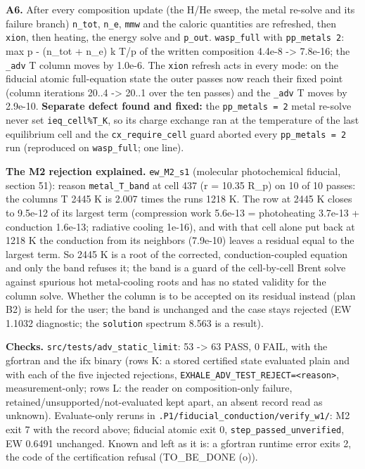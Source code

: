 \documentclass[english,a4paper]{my_memo}
\begin{document}
\textbf{A6.} After every composition update (the H/He sweep, the metal re-solve
and its failure branch) \texttt{n\_tot}, \texttt{n\_e}, \texttt{mmw} and the caloric quantities are
refreshed, then \texttt{xion}, then heating, the energy solve and \texttt{p\_out}.
\texttt{wasp\_full} with \texttt{pp\_metals\ 2}: max \textbar p - (n\_tot + n\_e) k T\textbar/p of the written
composition 4.4e-8 -\textgreater{} 7.8e-16; the \texttt{\_adv} T column moves by 1.0e-6. The
\texttt{xion} refresh acts in every mode: on the fiducial atomic full-equation
state the outer passes now reach their fixed point (column iterations
20..4 -\textgreater{} 20..1 over the ten passes) and the \texttt{\_adv} T moves by 2.9e-10.
\textbf{Separate defect found and fixed:} the \texttt{pp\_metals\ =\ 2} metal re-solve
never set \texttt{ieq\_cell\%T\_K}, so its charge exchange ran at the temperature of
the last equilibrium cell and the \texttt{cx\_require\_cell} guard aborted every
\texttt{pp\_metals\ =\ 2} run (reproduced on \texttt{wasp\_full}; one line).

\textbf{The M2 rejection explained.} \texttt{ew\_M2\_s1} (molecular photochemical
fiducial, section 51): reason \texttt{metal\_T\_band} at cell 437 (r = 10.35 R\_p) on
10 of 10 passes: the column\textquotesingle s T 2445 K is 2.007 times the run\textquotesingle s 1218 K. The
row at 2445 K closes to 9.5e-12 of its largest term (compression work
5.6e-13 = photoheating 3.7e-13 + conduction 1.6e-13; radiative cooling
1e-16), and with that cell alone put back at 1218 K the conduction from its
neighbors (7.9e-10) leaves a residual equal to the largest term. So 2445 K
is a root of the corrected, conduction-coupled equation and only the band
refuses it; the band is a guard of the cell-by-cell Brent solve against
spurious hot metal-cooling roots and has no stated validity for the column
solve. Whether the column is to be accepted on its residual instead (plan
B2) is held for the user; the band is unchanged and the case stays
rejected (EW 1.1032 diagnostic; the \texttt{solution} spectrum 8.563 is a result).

\textbf{Checks.} \texttt{src/tests/adv\_static\_limit}: 53 -\textgreater{} 63 PASS, 0 FAIL, with the
gfortran and the ifx binary (rows K: a stored certified state evaluated
plain and with each of the five injected rejections,
\texttt{EXHALE\_ADV\_TEST\_REJECT=\textless{}reason\textgreater{}}, measurement-only; rows L: the reader on
composition-only failure, retained/unsupported/not-evaluated kept apart, an
absent record read as unknown). Evaluate-only reruns in
\texttt{.P1/fiducial\_conduction/verify\_w1/}: M2 exit 7 with the record above;
fiducial atomic exit 0, \texttt{step\_passed\_unverified}, EW 0.6491 unchanged.
Known and left as it is: a gfortran runtime error exits 2, the code of the
certification refusal (TO\_BE\_DONE (o)).
\end{document}
